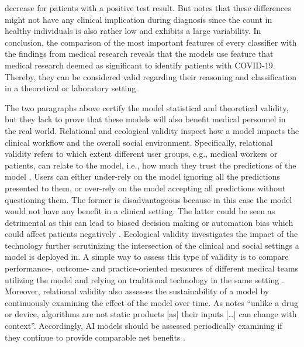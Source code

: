decrease for patients with a positive test result. But \cite{RN162} notes that 
these differences might not have any clinical implication during diagnosis since 
the count in healthy individuals is also rather low and exhibits a large 
variability.
In conclusion, the comparison of the most important features of every 
classifier with the findings from medical research reveals that the models use 
feature that medical research deemed as significant to identify patients with 
COVID-19. Thereby, they can be considered valid regarding their reasoning and 
classification in a theoretical or laboratory setting.
\par
The two paragraphs above certify the model statistical and theoretical 
validity, but they lack to prove that these models will also benefit medical 
personnel in the real world. Relational and ecological validity inspect how a 
model impacts the clinical workflow and the overall social environment. 
Specifically, relational validity refers to which extent different user groups, 
e.g., medical workers or patients, can relate to the model, i.e., how much they 
trust the predictions of the model \cite{RN151}. Users can either under-rely on 
the model ignoring all the predictions presented to them, or over-rely on the 
model accepting all predictions without questioning them. The former is 
disadvantageous because in this case the model would not have any benefit in a 
clinical setting. The latter could be seen as detrimental as this can lead to 
biased decision making or automation bias which could affect patients 
negatively \cite{RN151, RN152}.
Ecological validity investigates the impact of the technology further 
scrutinizing the intersection of the clinical and social settings a model is 
deployed in. A simple way to assess this type of validity is to compare 
performance-, outcome- and practice-oriented measures of different medical 
teams utilizing the model and relying on traditional technology in the same 
setting \cite{RN152}. Moreover, relational validity also assesses the 
sustainability of a model by continuously examining the effect of the model 
over time. As \citeauthor{RN198} \cite{RN198} notes ``unlike a drug or device, 
algorithms are not static products [as] their inputs […] can change with 
context''. Accordingly, AI models should be assessed periodically examining 
if they continue to provide comparable net benefits \cite{RN152}.
